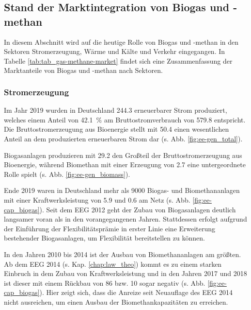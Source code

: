 \subsection{Stand der Marktintegration von Biogas und -methan}

In diesem Abschnitt wird auf die heutige Rolle von Biogas und -methan in den Sektoren Stromerzeugung, Wärme und Kälte und Verkehr eingegangen. In Tabelle \ref{tab:tab_gas-methane-market} findet sich eine Zusammenfassung der Marktanteile von Biogas und -methan nach Sektoren.




\subsubsection{Stromerzeugung}

Im Jahr 2019 wurden in Deutschland \SI{244.3}{\twh} erneuerbarer Strom produziert, welches einem Anteil von \SI{42.1}{\percent} am Bruttostromverbrauch von \SI{579.8}{\twh} entspricht. Die Bruttostromerzeugung aus Bioenergie stellt mit \SI{50.4}{\twh} einen wesentlichen Anteil an dem produzierten erneuerbaren Strom dar (s. Abb. \ref{fig:ee-gen_total}). \parencite{BWE2020} 



Biogasanlagen produzieren mit \SI{29.2}{\twh} den Großteil der Bruttostromerzeugung aus Bioenergie, während Biomethan mit einer Erzeugung von \SI{2.7}{\twh} eine untergeordnete Rolle spielt (s. Abb. \ref{fig:ee-gen_biomass}). \parencite{BWE2020} 



Ende 2019 waren in Deutschland mehr als \SI{9000}{\relax} Biogas- und Biomethananlagen mit einer Kraftwerksleistung von \SI{5.9}{\gw} und \SI{0.6}{\gw} am Netz (s. Abb. \ref{fig:ee-cap_biogas}). Seit dem \gls{EEG} \SI{2012}{\relax} geht der Zubau von Biogasanlagen deutlich langsamer voran als in den vorangegangenen Jahren. Stattdessen erfolgt aufgrund der Einführung der Flexibilitätsprämie in erster Linie eine Erweiterung bestehender Biogasanlagen, um Flexibilität bereitstellen zu können. \parencite{BWE2020} \parencite{DanielGromke2019}



In den Jahren 2010 bis \SI{2014}{\relax} ist der Ausbau von Biomethananlagen am größten. Ab dem \gls{EEG} \SI{2014}{\relax} (s. Kap. \ref{chap:law_theo}) kommt es zu einem starken Einbruch in dem Zubau von Kraftwerksleistung und in den Jahren \SI{2017}{\relax} und \SI{2018}{\relax} ist dieser mit einem Rückbau von \SI{86}{\mw} bzw. \SI{10}{\mw} sogar negativ (s. Abb. \ref{fig:ee-cap_biogas}). Hier zeigt sich, dass die Anreize seit Neuauflage des \gls{EEG} \SI{2014}{\relax} nicht ausreichen, um einen Ausbau der Biomethankapazitäten zu erreichen. \parencite{BWE2020} \smallskip

